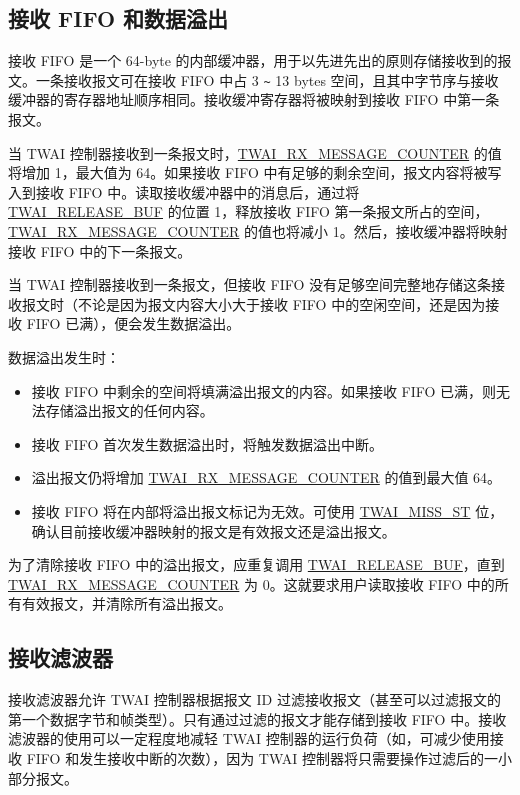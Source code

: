 \documentclass[main\_\_CN.tex]{subfiles}
\begin{document}
\subsection{接收 FIFO 和数据溢出}

接收 FIFO 是一个 64-byte 的内部缓冲器，用于以先进先出的原则存储接收到的报文。一条接收报文可在接收 FIFO 中占 3 \verb+~+ 13 bytes 空间，且其中字节序与接收缓冲器的寄存器地址顺序相同。接收缓冲寄存器将被映射到接收 FIFO 中第一条报文。

当 TWAI 控制器接收到一条报文时，\hyperref[fielddesc:TWAIRXMESSAGECOUNTER]{TWAI\_RX\_MESSAGE\_COUNTER} 的值将增加 1，最大值为 64。如果接收 FIFO 中有足够的剩余空间，报文内容将被写入到接收 FIFO 中。读取接收缓冲器中的消息后，通过将 \hyperref[fielddesc:TWAIRELEASEBUF]{TWAI\_RELEASE\_BUF} 的位置 1，释放接收 FIFO 第一条报文所占的空间，\hyperref[fielddesc:TWAIRXMESSAGECOUNTER]{TWAI\_RX\_MESSAGE\_COUNTER} 的值也将减小 1。然后，接收缓冲器将映射接收 FIFO 中的下一条报文。

当 TWAI 控制器接收到一条报文，但接收 FIFO 没有足够空间完整地存储这条接收报文时（不论是因为报文内容大小大于接收 FIFO 中的空闲空间，还是因为接收 FIFO 已满），便会发生数据溢出。

数据溢出发生时：
\begin{itemize}
    \item 接收 FIFO 中剩余的空间将填满溢出报文的内容。如果接收 FIFO 已满，则无法存储溢出报文的任何内容。
    \item 接收 FIFO 首次发生数据溢出时，将触发数据溢出中断。
    \item 溢出报文仍将增加 \hyperref[fielddesc:TWAIRXMESSAGECOUNTER]{TWAI\_RX\_MESSAGE\_COUNTER} 的值到最大值 64。
    \item 接收 FIFO 将在内部将溢出报文标记为无效。可使用 \hyperref[fielddesc:TWAIMISSST]{TWAI\_MISS\_ST} 位，确认目前接收缓冲器映射的报文是有效报文还是溢出报文。
\end{itemize}

为了清除接收 FIFO 中的溢出报文，应重复调用 \hyperref[fielddesc:TWAIRELEASEBUF]{TWAI\_RELEASE\_BUF}，直到 \hyperref[fielddesc:TWAIRXMESSAGECOUNTER]{TWAI\_RX\_MESSAGE\_COUNTER} 为 0。这就要求用户读取接收 FIFO 中的所有有效报文，并清除所有溢出报文。

\subsection{接收滤波器}

接收滤波器允许 TWAI 控制器根据报文 ID 过滤接收报文（甚至可以过滤报文的第一个数据字节和帧类型）。只有通过过滤的报文才能存储到接收 FIFO 中。接收滤波器的使用可以一定程度地减轻 TWAI 控制器的运行负荷（如，可减少使用接收 FIFO 和发生接收中断的次数），因为 TWAI 控制器将只需要操作过滤后的一小部分报文。
\end{document}
